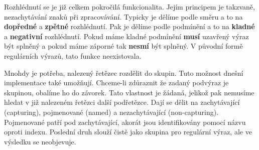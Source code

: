 Rozhlédnutí se je již celkem pokročilá funkcionalita. 
Jejím principem je takzvaně, nezachytávání znaků při zpracovávání.
Typicky je dělíme podle směru a to na \textbf{dopředné} a \textbf{zpětné} rozhlédnutí.
Pak je dělíme podle podmínění a to na \textbf{kladné} a \textbf{negativní} rozhlédnutí.
Pokud máme kladné podmínění \textbf{musí} uzavřený výraz být splněný a pokud máme záporné tak \textbf{nesmí} být splněný.
V původní formě regulárních výrazů, tato funkce neexistovala.

Mnohdy je potřeba, nalezený řetězec rozdělit do skupin. 
Tuto možnost dnešní implementace také umožňují.
Chceme-li zdůraznit že zadaný podvýraz je skupinou, obalíme ho do závorek.
Tato vlastnost je žádaná, jelikož pak nemusíme hledat v již nalezeném řetězci další podřetězce.
Dají se dělit na zachytávající (capturing), pojmenované (named) a nezachytávající (non-capturing).
Pojmenované patří pod zachytávající, akorát jsou identifikovány pomocí názvu oproti indexu.
Poslední druh slouží čistě jako skupina pro regulární výraz, ale ve výsledku se neobjevuje.

\endinput